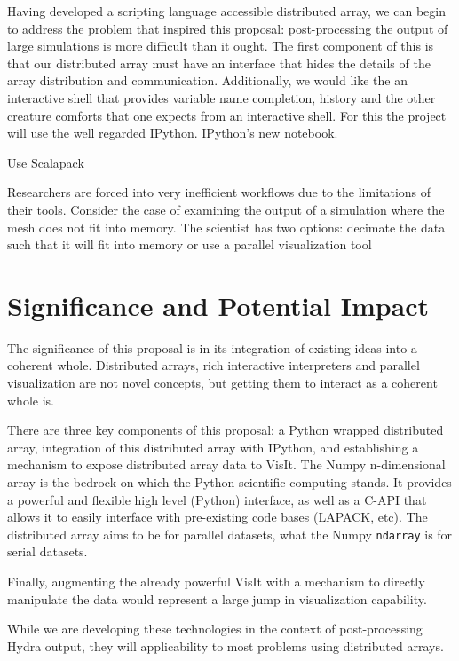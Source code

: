 \documentclass[a4paper]{article}
\begin{document}
Having developed a scripting language accessible distributed array, we can begin to address the problem that inspired this proposal: post-processing the output of large simulations is more difficult than it ought.  The first component of this is that our distributed array must have an interface that hides the details of the array distribution and communication.  Additionally, we would like the an interactive shell that provides variable name completion, history and the other creature comforts that one expects from an interactive shell.  For this the project will use the well regarded IPython.  IPython's new notebook\cite{ipython-notebook}.

Use Scalapack

Researchers are forced into very inefficient workflows due to the limitations of their tools.  Consider the case of examining the output of a simulation where the mesh does not fit into memory.  The scientist has two options: decimate the data such that it will fit into memory or use a parallel visualization tool



\section*{Significance and Potential Impact}
The significance of this proposal is in its integration of existing ideas into a coherent whole.  Distributed arrays, rich interactive interpreters and parallel visualization are not novel concepts, but getting them to interact as a coherent whole is.

There are three key components of this proposal: a Python wrapped distributed array, integration of this distributed array with IPython, and establishing a mechanism to expose distributed array data to VisIt.  The Numpy n-dimensional array is the bedrock on which the Python scientific computing stands.  It provides a powerful and flexible high level (Python) interface, as well as a C-API that allows it to easily interface with pre-existing code bases (LAPACK, etc).  The distributed array aims to be for parallel datasets, what the Numpy \texttt{ndarray} is for serial datasets.

Finally, augmenting the already powerful VisIt with a mechanism to directly manipulate the data would represent a large jump in visualization capability.

While we are developing these technologies in the context of post-processing Hydra output, they will applicability to most problems using distributed arrays.
\end{document}
